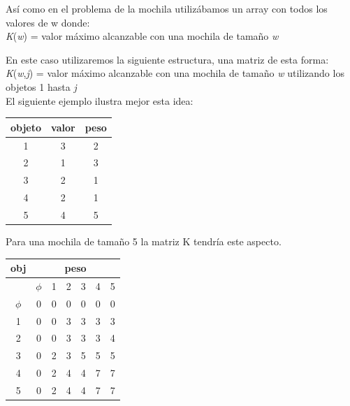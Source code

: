 \documentclass[es]{ifirak}
\begin{document}
Así como en el problema de la mochila utilizábamos un array con todos los valores de w donde:\\

 \textit{K}(\textit{w}) = valor máximo alcanzable con una mochila de tamaño \textit{w} 

En este caso utilizaremos la siguiente estructura, una matriz de esta forma:\\

\textit{K}(\textit{w},\textit{j}) = valor máximo alcanzable con una mochila de tamaño\textit{ w} utilizando los objetos 1 hasta \textit{j}\\

El siguiente ejemplo ilustra mejor esta idea:

	\begin{table}[htbp]
		\begin{tabular}{|c|c|c|}
			\hline
			 \cellcolor{gray}	objeto & \cellcolor{gray} valor &\cellcolor{gray} peso \\
			\hline
		1&	3&	2\\
		2&	1&	3\\
		3&	2&	1\\
		4&	2&	1\\
		5&	4&	5	\\
			\hline
		\end{tabular}
\end{table}
Para una mochila de tamaño 5 la matriz K tendría este aspecto.
\begin{table}[htbp]
	\begin{tabular}{|c|c|c|c|c|c|c|}
		\hline
	obj &  \multicolumn{6}{|c|}{peso} \\
		\hline
\cellcolor{gray}	&\cellcolor{gray}	$\phi$&\cellcolor{gray}	1& \cellcolor{gray}2& \cellcolor{gray} 3& \cellcolor{gray} 4&\cellcolor{gray} 5\\
		\hline
\cellcolor{gray} $\phi$&	0&	0& 0&  0&  0& 0\\
		\hline
\cellcolor{gray}	1&	0&	0& 3&  3&  3& 3\\
		\hline
\cellcolor{gray}	2&	0&	0& 3&  3&  3& 4\\
		\hline
\cellcolor{gray}	3&	0&	2& 3&  5&  5& 5\\
		\hline
\cellcolor{gray}	4&	0&	2& 4&  4&  7& 7\\
		\hline
\cellcolor{gray}	5&	0&	2& 4&  4&  7& 7\\
		\hline
	\end{tabular}
\end{table}
\end{document}
